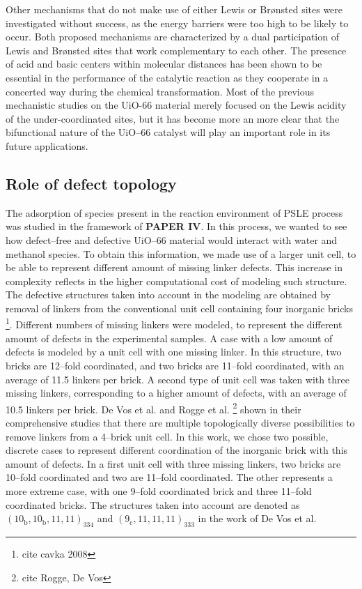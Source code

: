 Other mechanisms that do not make use of either Lewis or Br\o{}nsted sites were investigated without success, as the energy barriers were too high to be likely to occur. Both proposed mechanisms are characterized by a dual participation of Lewis and Br\o{}nsted sites that work complementary to each other.  The presence of acid and basic centers within molecular distances has been shown to be essential in the performance of the catalytic reaction as they cooperate in a concerted way during the chemical transformation. Most of the previous mechanistic studies on the UiO-66 material merely focused on the Lewis acidity of the under-coordinated sites, but it has become more an more clear that the bifunctional nature of the UiO--66 catalyst will play an important role in its future applications.

\subsection{Role of defect topology}
The adsorption of species present in the reaction environment of PSLE process was studied in the framework of \textbf{PAPER IV}. In this process, we wanted to see how defect--free and defective UiO--66 material would interact with water and methanol species. To obtain this information, we made use of a larger unit cell, to be able to represent different amount of missing linker defects. This increase in complexity reflects in the higher computational cost of modeling such structure. The defective structures taken into account in the modeling are obtained by removal of linkers from the conventional unit cell containing four inorganic  bricks \footnote{cite cavka 2008}. Different numbers of missing linkers were modeled, to represent the different amount of defects in the experimental samples. A case with a low amount of defects is modeled by a unit cell with one missing linker. In this structure, two bricks are 12--fold coordinated, and two bricks are 11--fold coordinated, with an average of 11.5 linkers per brick. A second type of unit cell was taken with three missing linkers, corresponding to a higher amount of defects, with an average of 10.5 linkers per brick. De Vos et al. and Rogge et al. \footnote{cite Rogge, De Vos} shown in their comprehensive studies that there are multiple topologically diverse possibilities to remove linkers from a 4--brick unit cell. In this work, we chose two possible, discrete cases to represent different coordination of the inorganic brick with this amount of defects. In a first unit cell with three missing linkers, two bricks are 10--fold coordinated and two are 11--fold coordinated. The other represents a more extreme case, with one 9--fold coordinated brick and three 11--fold coordinated bricks. The structures taken into account are denoted as $\mathrm{(10_{b}, 10_{b}, 11, 11)_{334}}$ and $\mathrm{(9_{c}, 11, 11, 11)_{333}}$ in the work of De Vos et al. 
